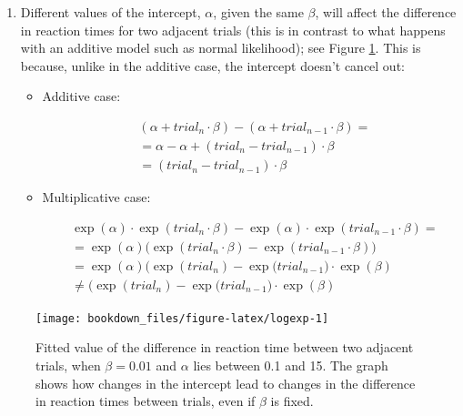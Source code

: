 \documentclass[12pt,]{krantz}
\theoremstyle{definition}
\theoremstyle{definition}
\theoremstyle{definition}
\theoremstyle{remark}
\begin{document}
\begin{enumerate}
\def\labelenumi{\arabic{enumi}.}
\item
  Different values of the intercept, \(\alpha\), given the same \(\beta\), will affect the difference in reaction times for two adjacent trials (this is in contrast to what happens with an additive model such as normal likelihood); see Figure \ref{fig:logexp}. This is because, unlike in the additive case, the intercept doesn't cancel out:

  \begin{itemize}
  \item
    Additive case:

    \begin{equation}
    \begin{aligned}
    & (\alpha + trial_n \cdot \beta) - (\alpha + trial_{n-1} \cdot \beta) = \\
    &=\alpha -\alpha + ( trial_n - trial_{n-1} ) \cdot \beta\\
    &= ( trial_n - trial_{n-1} ) \cdot \beta
    \end{aligned}
    \end{equation}
  \item
    Multiplicative case:

    \begin{equation}
    \begin{aligned}
       &\exp(\alpha) \cdot \exp(trial_n \cdot \beta) -\exp(\alpha) \cdot \exp(trial_{n-1} \cdot \beta) =\\ 
       &= \exp(\alpha) \big(\exp(trial_n  \cdot \beta)  - \exp(trial_{n-1}\cdot \beta) \big)\\
       &= \exp(\alpha) \big(\exp(trial_n)  - \exp(trial_{n-1}  \big) \cdot \exp(\beta)\\
       &\neq \big(\exp(trial_n)  - \exp(trial_{n-1}  \big) \cdot \exp(\beta) 
    \end{aligned}
       \end{equation}
  \end{itemize}
\end{enumerate}



\begin{figure}[H]
  \texttt{[image: bookdown\_files/figure-latex/logexp-1]} \caption{Fitted value of the difference in reaction time between two adjacent trials, when \(\beta=0.01\) and \(\alpha\) lies between 0.1 and 15. The graph shows how changes in the intercept lead to changes in the difference in reaction times between trials, even if \(\beta\) is fixed.}\label{fig:logexp}
  \end{figure}
\end{document}
